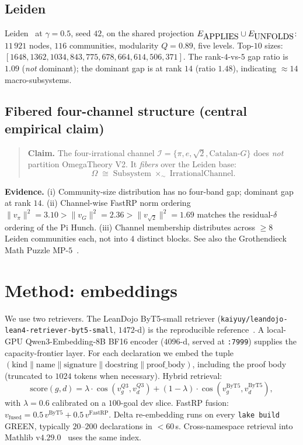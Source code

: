\documentclass[11pt]{article}
\begin{document}
\subsection{Leiden}

Leiden~\citep{traag2019leiden} at $\gamma = 0.5$, seed $42$, on the
shared projection $E_{\lstinline|APPLIES|} \cup E_{\lstinline|UNFOLDS|}$:
$11\,921$ nodes, $116$ communities, modularity $Q = 0.89$, five levels.
Top-$10$ sizes: $[1648,1362,1034,843,775,678,664,614,506,371]$. The
rank-$4$-vs-$5$ gap ratio is $1.09$ (\emph{not} dominant); the dominant
gap is at rank $14$ (ratio $1.48$), indicating $\approx 14$ macro-subsystems.

\subsection{Fibered four-channel structure (central empirical claim)}
\label{sec:fibered}

\begin{quote}
\textbf{Claim.} The four-irrational channel
$\mathcal{I}=\{\pi,e,\sqrt{2},\text{Catalan-}G\}$ does \emph{not}
partition OmegaTheory V2. It \emph{fibers} over the Leiden base:
\[
  \Omega \;\cong\; \mathrm{Subsystem} \;\times_\sim\; \mathrm{IrrationalChannel}.
\]
\end{quote}

\noindent\textbf{Evidence.}
(i) Community-size distribution has no four-band gap; dominant gap at
rank $14$. (ii) Channel-wise FastRP norm ordering
$\|v_\pi\|^2 = 3.10 > \|v_G\|^2 = 2.36 > \|v_{\sqrt{2}}\|^2 = 1.69$ matches
the residual-$\delta$ ordering of the Pi Hunch. (iii) Channel membership
distributes across $\geq 8$ Leiden communities each, not into
$4$ distinct blocks. See also the Grothendieck Math Puzzle
MP-$5$~\citep{navi2026grothendieck}.

\section{Method: embeddings}
\label{sec:embeddings}

We use two retrievers. The LeanDojo ByT5-small retriever
(\lstinline|kaiyuy/leandojo-lean4-retriever-byt5-small|, $1472$-d)
is the reproducible reference~\citep{yang2023leandojo}. A local-GPU
Qwen3-Embedding-8B BF16 encoder ($4096$-d, served at
\texttt{:7999}) supplies the capacity-frontier layer. For each
declaration we embed the tuple
$(\text{kind}\|\text{name}\|\text{signature}\|\text{docstring}\|\text{proof\_body})$,
including the proof body (truncated to $1024$ tokens when necessary).
Hybrid retrieval:
\begin{equation}
  \mathrm{score}(g,d) = \lambda \cdot \cos(v^{Q3}_g, v^{Q3}_d) + (1-\lambda)\cdot \cos(v^{\mathrm{ByT5}}_g, v^{\mathrm{ByT5}}_d),
\end{equation}
with $\lambda = 0.6$ calibrated on a $100$-goal dev slice. FastRP
fusion: $v_{\mathrm{fused}} = 0.5\,v^{\mathrm{ByT5}} + 0.5\,v^{\mathrm{FastRP}}$.
Delta re-embedding runs on every \lstinline|lake build| GREEN,
typically $20$--$200$ declarations in $<60$\,s. Cross-namespace
retrieval into Mathlib v$4.29.0$~\citep{mathlib4} uses the same index.
\end{document}
